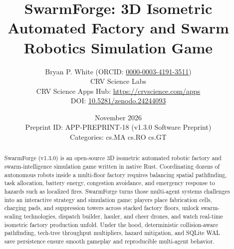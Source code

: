 \documentclass[10pt,letterpaper]{article}
\title{\textbf{SwarmForge: 3D Isometric Automated Factory and Swarm Robotics Simulation Game}}
\author{Bryan P. White (ORCID: \href{https://orcid.org/0000-0003-4191-3511}{0000-0003-4191-3511}) \\ CRV Science Labs \\ \small CRV Science Apps Hub: \url{https://crvscience.com/apps} \\ \small DOI: \href{https://doi.org/10.5281/zenodo.24244093}{10.5281/zenodo.24244093}}
\date{November 2026 \\ \small Preprint ID: APP-PREPRINT-18 (v1.3.0 Software Preprint) \\ \small Categories: cs.MA \textbullet{} cs.RO \textbullet{} cs.GT}
\begin{document}
\maketitle

\begin{abstract}
SwarmForge (v1.3.0) is an open-source 3D isometric automated robotic factory and swarm-intelligence simulation game written in native Rust. Coordinating dozens of autonomous robots inside a multi-floor factory requires balancing spatial pathfinding, task allocation, battery energy, congestion avoidance, and emergency response to hazards such as localized fires. SwarmForge turns those multi-agent systems challenges into an interactive strategy and simulation game: players place fabrication cells, charging pads, and suppression towers across stacked factory floors, unlock swarm-scaling technologies, dispatch builder, hauler, and cheer drones, and watch real-time isometric factory production unfold. Under the hood, deterministic collision-aware pathfinding, tech-tree throughput multipliers, hazard mitigation, and SQLite WAL save persistence ensure smooth gameplay and reproducible multi-agent behavior.
\end{abstract}
\end{document}
